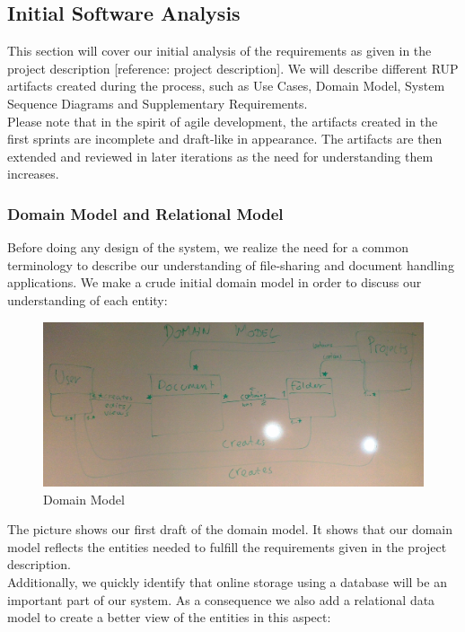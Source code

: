 \subsection{Initial Software Analysis}
This section will cover our initial analysis of the requirements as given in the project description [reference: project description]. We will describe different RUP artifacts created during the process, such as Use Cases, Domain Model, System Sequence Diagrams and Supplementary Requirements.\\
Please note that in the spirit of agile development, the artifacts created in the first sprints are incomplete and draft-like in appearance. The artifacts are then extended and reviewed in later iterations as the need for understanding them increases.\\
\subsubsection{Domain Model and Relational Model}
Before doing any design of the system, we realize the need for a common terminology to describe our understanding of file-sharing and document handling applications. We make a crude initial domain model in order to discuss our understanding of each entity:\\
\begin{figure}[H]
  \includegraphics[width=\textwidth,natwidth=2208,natheight=957]{illustrations/DomainModel.jpg}
  \caption{Domain Model}
  \label{domainmodel}
\end{figure}
The picture shows our first draft of the domain model. It shows that our domain model reflects the entities needed to fulfill the requirements given in the project description.\\
Additionally, we quickly identify that online storage using a database will be an important part of our system. As a consequence we also add a relational data model to create a better view of the entities in this aspect:\\
